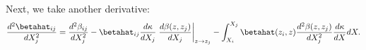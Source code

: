 Next, we take another derivative:
\begin{equation}
\frac{d^2 \betahat_{i j}}{d X_j^2} = \frac{d^2 \beta_{i j}}{d X_j^2} -  \betahat_{i j} \frac{d \kappa}{d X_j} \left. \frac{d \beta(z, z_j)}{d X_j}  \right|_{z \rightarrow z_j}  - \int_{X_i}^{X_j} \betahat(z_i, z) \frac{d^2 \beta(z, z_j)}{d X_j^2} \frac{d \kappa}{d X} d X.
\end{equation}
  
  
  